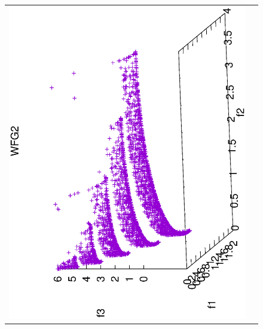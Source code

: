 \begin{figure}[H]
\begin{tabular}{cc}
  \includegraphics[scale=0.3, angle=-90,origin=c]{Figures_Chapter7/Results_Chapter4/Summary_Representative/VSD-MOEA/WFG2.eps} &

\end{tabular}
\end{figure}
